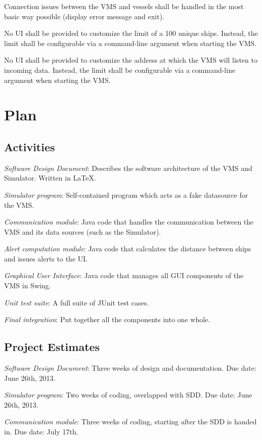 \documentclass{article}
\begin{document}
Connection issues between the VMS and vessels shall be handled in the most basic way possible (display error message and exit).

No UI shall be provided to customize the limit of a 100 unique ships. Instead, the limit shall be configurable via a command-line argument when starting the VMS. 

No UI shall be provided to customize the address at which the VMS will listen to incoming data. Instead, the limit shall be configurable via a command-line argument when starting the VMS.

\section{Plan} %

\subsection{Activities}

\emph{Software Design Document}: Describes the software architecture of the VMS and Simulator. Written in \LaTeX. 

\emph{Simulator program}: Self-contained program which acts as a fake datasource for the VMS.

\emph{Communication module}: Java code that handles the communication between the VMS and its data sources (such as the Simulator). 

\emph{Alert computation module}: Java code that calculates the distance between ships and issues alerts to the UI.

\emph{Graphical User Interface}: Java code that manages all GUI components of the VMS in Swing.

\emph{Unit test suite}: A full suite of JUnit test cases.

\emph{Final integration}: Put together all the components into one whole.

\subsection{Project Estimates}

\emph{Software Design Document}: Three weeks of design and documentation. Due date: June 26th, 2013.

\emph{Simulator program}: Two weeks of coding, overlapped with SDD. Due date: June 26th, 2013.

\emph{Communication module}: Three weeks of coding, starting after the SDD is handed in. Due date: July 17th.
\end{document}
